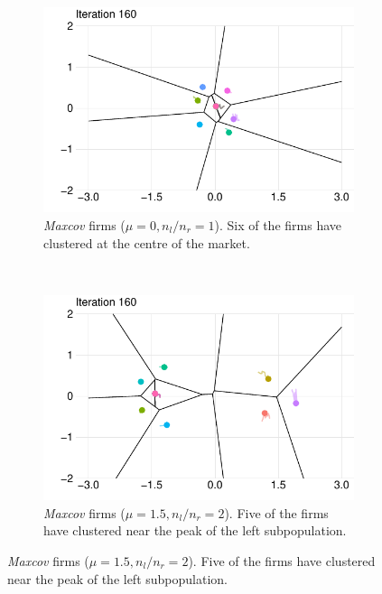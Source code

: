 \documentclass[preprint, 12pt]{elsarticle}
\begin{document}
\begin{figure}[hb!]
	\begin{subfigure}[t]{0.485\textwidth}
		\includegraphics[width=\textwidth]{Graphics/figm_cmu.pdf}
		\caption{\emph{Maxcov} firms ($\mu=0, n_l/n_r = 1$). Six of the firms have clustered at the centre of the market.}
		\label{fig:twelve_uni_maxcov}
	\end{subfigure}
	~
	\begin{subfigure}[t]{0.485\textwidth}
		\includegraphics[width=\textwidth]{Graphics/figm_cmb.pdf}
		\caption{\emph{Maxcov} firms ($\mu=1.5, n_l/n_r = 2$). Five of the firms have clustered near the peak of the left subpopulation.}
		\label{fig:twelve_bi_maxcov}
	\end{subfigure}
	

\end{figure}
\end{document}
